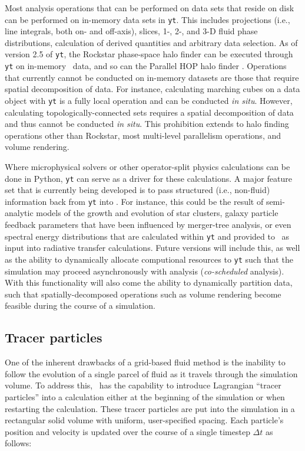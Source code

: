 Most analysis operations that can be performed on data sets that reside on
disk can be performed on in-memory data sets in \texttt{yt}.  This includes
projections (i.e., line integrals, both on- and off-axis), slices, 1-, 2-, and
3-D fluid phase distributions, calculation of derived quantities and arbitrary
data selection.  As of version 2.5 of \texttt{yt},  the Rockstar phase-space
halo finder \citep{2013ApJ...762..109B} can be executed through \texttt{yt} on
in-memory \enzo\ data, and so can the Parallel HOP halo finder
\citep{1998ApJ...498..137E, 2010ApJS..191...43S}.  Operations that currently cannot be conducted on
in-memory datasets are those that require spatial decomposition of
data.  For 
instance, calculating marching cubes on a data object with \texttt{yt} is a
fully local operation and can be conducted \textit{in situ}.  However,
calculating topologically-connected sets requires a spatial decomposition of
data and thus cannot be conducted \textit{in situ}.  This prohibition extends
to halo finding operations other than Rockstar, most multi-level
parallelism operations, and volume rendering.

Where microphysical solvers or other operator-split physics calculations can be
done in Python, \texttt{yt} can serve as a driver for these calculations.  A
major feature set that is currently being developed is to pass structured
(i.e., non-fluid) information back from \texttt{yt} into \enzo.  For instance,
this could be the result of semi-analytic models of the growth and evolution of
star clusters, galaxy particle feedback parameters that have been influenced by
merger-tree analysis, or even spectral energy distributions that are calculated
within \texttt{yt} and provided to \enzo\ as input into radiative transfer
calculations.  Future versions will include this, as well as the ability to
dynamically allocate computional resources to \texttt{yt} such that the simulation
may proceed asynchronously with analysis (\textit{co-scheduled} analysis).
With this functionality will also come the ability to dynamically partition
data, such that spatially-decomposed operations such as volume rendering become
feasible during the course of a simulation.

\subsection{Tracer particles}

One of the inherent drawbacks of a grid-based fluid method is the
inability to follow the evolution of a single parcel of fluid as it
travels through the simulation volume.  To address this, \enzo\ has the
capability to introduce Lagrangian ``tracer particles'' into a
calculation either at the beginning of the simulation or when
restarting the calculation.  These tracer particles are put into the
simulation in a rectangular solid volume with uniform, user-specified
spacing.  Each particle's position and velocity is updated over the
course of a single timestep $\Delta t$ as follows:

